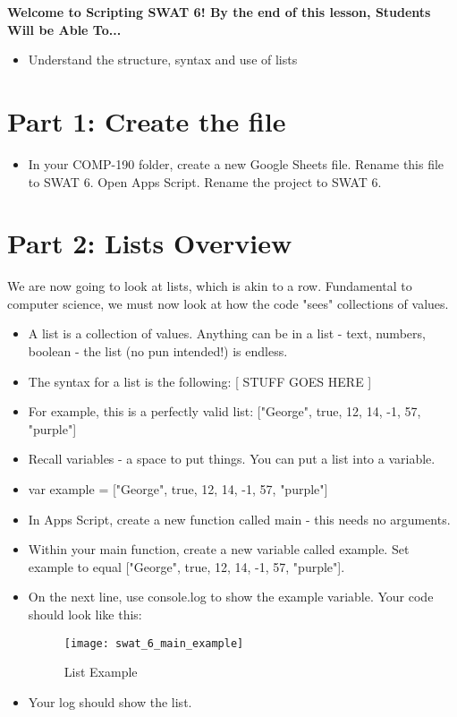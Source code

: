 \documentclass{article}
\newcommand{\AName}{Scripting SWAT 6}
\begin{document}
\textbf{Welcome to \AName!  By the end of this lesson, Students Will be Able To...}
\begin{itemize}
    \item Understand the structure, syntax and use of lists
\end{itemize}

\section*{Part 1: Create the file}
\begin{itemize}
    \item In your COMP-190 folder, create a new Google Sheets file.  Rename this file to SWAT 6.  Open Apps Script.  Rename the project to SWAT 6.
\end{itemize}

\section*{Part 2: Lists Overview}
We are now going to look at lists, which is akin to a row.  Fundamental to computer science, we must now look at how the code "sees" collections of values.
\begin{itemize}
    \item A list is a collection of values. Anything can be in a list - text, numbers, boolean - the list (no pun intended!) is endless.
    \item The syntax for a list is the following:  [ STUFF GOES HERE ]
    \item For example, this is a perfectly valid list:  ["George", true, 12, 14, -1, 57, "purple"]
    \item Recall variables - a space to put things.  You can put a list into a variable.
    \item var example = ["George", true, 12, 14, -1, 57, "purple"]
    \item In Apps Script, create a new function called main - this needs no arguments.  
    \item Within your main function, create a new variable called example.  Set example to equal ["George", true, 12, 14, -1, 57, "purple"].
    \item On the next line, use console.log to show the example variable.  Your code should look like this:
    \begin{figure}[H]
  		\centering
  		\texttt{[image: swat\_6\_main\_example]}
  		\caption{List Example}
	\end{figure}
	\item Your log should show the list.
\end{itemize}
\end{document}
